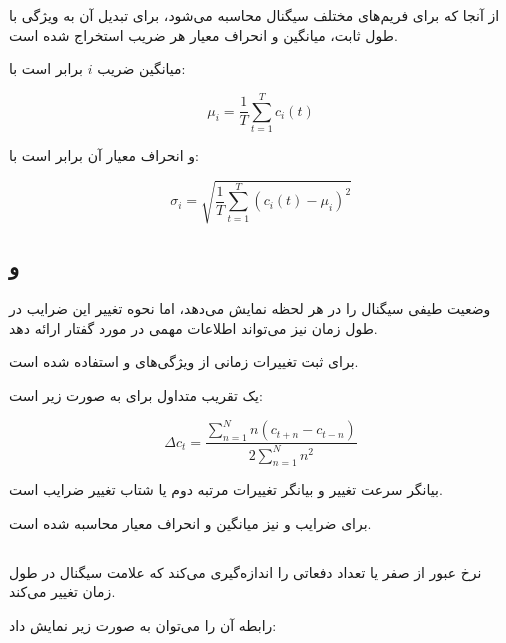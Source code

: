 \documentclass[12pt,a4paper,oneside]{report}
\begin{document}
از آنجا که
برای فریم‌های مختلف سیگنال محاسبه می‌شود، برای تبدیل آن به ویژگی با طول ثابت، میانگین و انحراف معیار هر ضریب استخراج شده است.

میانگین ضریب $i$ برابر است با:

\begin{equation}
\mu_i
=
\frac{1}{T}
\sum_{t=1}^{T}
c_i(t)
\end{equation}

و انحراف معیار آن برابر است با:

\begin{equation}
\sigma_i
=
\sqrt{
\frac{1}{T}
\sum_{t=1}^{T}
(c_i(t)-\mu_i)^2
}
\end{equation}

\subsection{ و }

وضعیت طیفی سیگنال را در هر لحظه نمایش می‌دهد، اما نحوه تغییر این ضرایب در طول زمان نیز می‌تواند اطلاعات مهمی در مورد گفتار ارائه دهد.

برای ثبت تغییرات زمانی از ویژگی‌های
و
استفاده شده است.

یک تقریب متداول برای
به صورت زیر است:

\begin{equation}
\Delta c_t
=
\frac{
\sum_{n=1}^{N}
n(c_{t+n}-c_{t-n})
}{
2
\sum_{n=1}^{N}
n^2
}
\end{equation}

بیانگر سرعت تغییر
و
بیانگر تغییرات مرتبه دوم یا شتاب تغییر ضرایب است.

برای ضرایب
و
نیز میانگین و انحراف معیار محاسبه شده است.


\subsection{}

نرخ عبور از صفر یا
تعداد دفعاتی را اندازه‌گیری می‌کند که علامت سیگنال در طول زمان تغییر می‌کند.

رابطه آن را می‌توان به صورت زیر نمایش داد:
\end{document}
